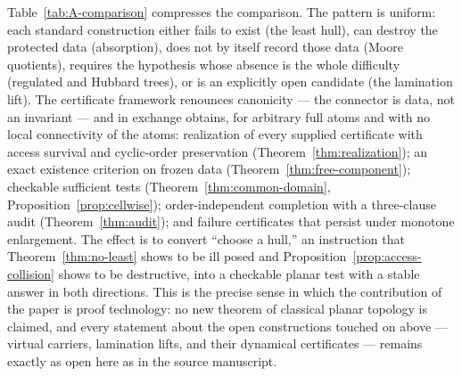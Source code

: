 Table~\ref{tab:A-comparison} compresses the comparison.  The pattern is
uniform: each standard construction either fails to exist (the least
hull), can destroy the protected data (absorption), does not by itself
record those data (Moore quotients),
requires the hypothesis whose absence is the whole difficulty (regulated
and Hubbard trees), or is an explicitly open candidate (the lamination
lift).  The certificate framework renounces canonicity --- the connector
is data, not an invariant --- and in exchange obtains, for arbitrary
full atoms and with no local connectivity of the atoms: realization of every
supplied certificate with
access survival and cyclic-order preservation
(Theorem~\ref{thm:realization}); an exact existence criterion on frozen
data (Theorem~\ref{thm:free-component}); checkable sufficient tests
(Theorem~\ref{thm:common-domain}, Proposition~\ref{prop:cellwise});
order-independent completion with a three-clause audit
(Theorem~\ref{thm:audit}); and failure certificates that persist under
monotone enlargement.  The effect is to convert ``choose a hull,''
an instruction that Theorem~\ref{thm:no-least} shows to be ill posed and
Proposition~\ref{prop:access-collision} shows to be destructive, into a
checkable planar test with a stable answer in both directions.  This is
the precise sense in which the contribution of the paper is proof
technology: no new theorem of classical planar topology is claimed, and
every statement about the open constructions touched on above ---
virtual carriers, lamination lifts, and their dynamical certificates ---
remains exactly as open here as in the source manuscript.

